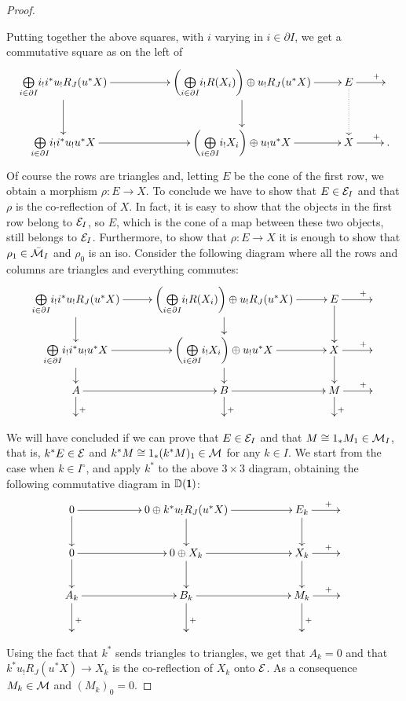 \begin{proof}
\begin{enumerate}
\end{enumerate}
Putting together the above squares, with $i$ varying in $i\in\partial I$, we get a commutative square as on the left of
\[
\xymatrix{
\underset{i\in\partial I}{\bigoplus}i_!i^*u_!R_J(u^*X)\ar[rr]\ar[d]&&\left(\underset{i\in\partial I}{\bigoplus}i_!R(X_i)\right)\oplus u_!R_J(u^*X)\ar[d] \ar[r]& E\ar@{.>}[d]\ar[r]^(.7){+}&\\ 
\underset{i\in\partial I}{\bigoplus}i_!i^*u_!u^*X\ar[rr]&&\left(\underset{i\in\partial I}{\bigoplus}i_!X_i\right)\oplus u_!u^*X \ar[r]& X\ar[r]^(.7){+}&.
}
\]
Of course the rows are triangles and, letting $E$ be the cone of the first row, we obtain a morphism $\rho\colon E\to X$. To conclude we have to show that $E\in \mathcal{E}_I$ and that $\rho$ is the co-reflection of $X$.  In fact, it is easy to show that the objects in the first row 
belong to $\mathcal{E}_I$, so $E$, which is the cone of a map between these two objects, still belongs to $\mathcal{E}_I$. Furthermore, to show that $\rho\colon E\to X$ it is enough to show that $\rho_1\in\bar{\mathcal{M}}_I$ and $\rho_0$ is an iso. Consider the following diagram where all the rows and columns are triangles and everything commutes:
\[
\xymatrix@R=15pt@C=10pt{
\underset{i\in\partial I}{\bigoplus}i_!i^*u_!R_J(u^*X)\ar[rr]\ar[d]&&\left(\underset{i\in\partial I}{\bigoplus}i_!R(X_i)\right)\oplus u_!R_J(u^*X)\ar[d]\ar[rr]&&E\ar[rr]^(.7){+}\ar[d]&&\\ 
\underset{i\in\partial I}{\bigoplus}i_!i^*u_!u^*X\ar[rr]\ar[d]&&\left(\underset{i\in\partial I}{\bigoplus}i_!X_i\right)\oplus u_!u^*X\ar[d]\ar[rr]&&X\ar[rr]^(.7){+}\ar[d]&&\\
A\ar[d]^(.7){+}\ar[rr]&&B\ar[rr]\ar[d]^(.7){+}&&M\ar[rr]^(.7){+}\ar[d]^(.7){+}&&\\
&&&&&}
\]
We will have concluded if we can prove that $E\in\mathcal{E}_I$ and that $M\cong 1_*M_1\in \mathcal{M}_I$, that is, $k^*E\in \mathcal{E}$ and $k^*M\cong 1_*(k^*M)_1\in \mathcal{M}$ for any $k\in I$. We start from the case when $k\in I^\circ$, and apply $k^*$  to the above $3\times 3$ diagram, obtaining the following commutative diagram in $\D(\uno)$:
\[
\xymatrix{
0\ar[rr]\ar[d]&&0\oplus k^*u_!R_J(u^*X)\ar[d]\ar[rr]&&E_k\ar[d]\ar[r]^(.65)+&\\ 
0\ar[rr]\ar[d]&&0\oplus X_k\ar[rr]\ar[d]&&X_k\ar[d]\ar[r]^(.65)+&\\
A_k\ar[d]^(.65)+\ar[rr]&&B_k\ar[d]^(.65)+\ar[rr]&&M_k\ar[d]^(.65)+\ar[r]^(.65)+&\\
&&&&&
}
\]
%
%
Using the fact that $k^*$ sends triangles to triangles, we get that $A_k=0$ and that $k^*u_!R_J(u^*X)\to X_k$ is the co-reflection of $X_k$ onto $\mathcal{E}$. As a consequence $M_k\in \mathcal{M}$ and $(M_k)_0=0$.


\end{proof}
